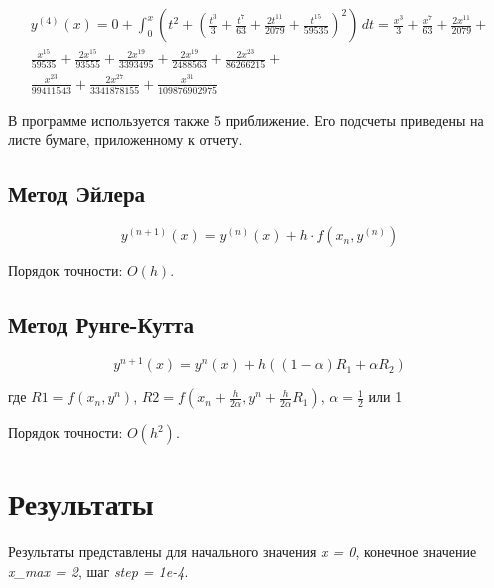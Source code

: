 \begin{equation}
    \begin{split}
        \label{f4}
        y^{(4)}(x) = 0 + \int_{0}^{x} (t^2 + \left(\frac{t^3}{3} + \frac{t^7}{63} + \frac{2t^{11}}{2079} + \frac{t^{15}}{59535}\right)^2) \,dt = \frac{x^3}{3} + \frac{x^7}{63} + \frac{2x^{11}}{2079} +\\
        \frac{x^{15}}{59535} + \frac{2x^{15}}{93555} + \frac{2x^{19}}{3393495} + \frac{2x^{19}}{2488563} + \frac{2x^{23}}{86266215} + \\
        \frac{x^{23}}{99411543} + \frac{2x^{27}}{3341878155}  + \frac{x^{31}}{109876902975}
    \end{split}
\end{equation}

В программе используется также 5 приближение. Его подсчеты приведены на листе бумаге, приложенному к отчету.
 
\subsection{Метод Эйлера}

\begin{equation}
    \label{ey}
    y^{(n+1)}(x) = y^{(n)}(x) + h \cdot f(x_{n}, y^{(n)})
\end{equation}

\indent Порядок точности: $O(h)$.

\subsection{Метод Рунге-Кутта}

\begin{equation}
    \label{rk}
    y^{n+1}(x) = y^{n}(x) + h ((1-\alpha) R_1 + \alpha R_2)
\end{equation}\newline

где $R1 = f(x_{n}, y^{n})$, $R2 = f(x_{n} + \frac{h}{2\alpha}, y^{n} + \frac{h}{2\alpha}R_1)$, $\alpha = \frac{1}{2}$ или 1\newline

Порядок точности: $O(h^2)$.

\section{Результаты}

Результаты представлены для начального значения \textit{x = 0}, конечное значение \textit{x\_max = 2}, шаг \textit{step = 1e-4}.

